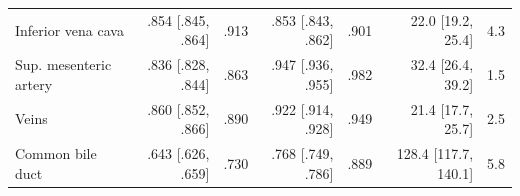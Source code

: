 \begin{tabular}{lrrrrrr}
Inferior vena cava & .854 {\scriptsize [.845, .864]} & .913 & .853 {\scriptsize [.843, .862]} & .901 & 22.0 {\scriptsize [19.2, 25.4]} & 4.3 \\
Sup. mesenteric artery & .836 {\scriptsize [.828, .844]} & .863 & .947 {\scriptsize [.936, .955]} & .982 & 32.4 {\scriptsize [26.4, 39.2]} & 1.5 \\
Veins & .860 {\scriptsize [.852, .866]} & .890 & .922 {\scriptsize [.914, .928]} & .949 & 21.4 {\scriptsize [17.7, 25.7]} & 2.5 \\
Common bile duct & .643 {\scriptsize [.626, .659]} & .730 & .768 {\scriptsize [.749, .786]} & .889 & 128.4 {\scriptsize [117.7, 140.1]} & 5.8 \\
\bottomrule
\end{tabular}
